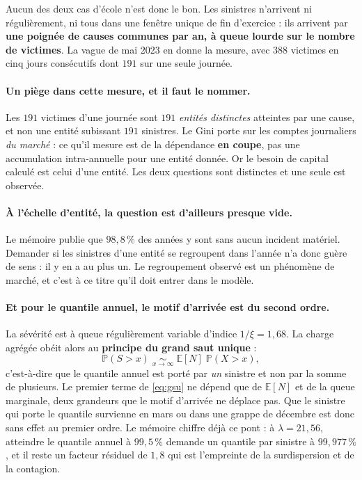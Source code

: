\documentclass[11pt,a4paper]{article}
\newcommand{\E}{\mathbb{E}}
\newcommand{\Prob}{\mathbb{P}}
\begin{document}
\vspace{4pt}
\noindent Aucun des deux cas d'école n'est donc le bon. Les sinistres n'arrivent ni
régulièrement, ni tous dans une fenêtre unique de fin d'exercice : ils arrivent par
\textbf{une poignée de causes communes par an, à queue lourde sur le nombre de victimes}. La
vague de mai 2023 en donne la mesure, avec $388$ victimes en cinq jours consécutifs dont
$191$ sur une seule journée.

\paragraph{Un piège dans cette mesure, et il faut le nommer.} Les $191$ victimes d'une
journée sont $191$ \emph{entités distinctes} atteintes par une cause, et non une entité
subissant $191$ sinistres. Le Gini porte sur les comptes journaliers \emph{du marché} : ce
qu'il mesure est de la dépendance \textbf{en coupe}, pas une accumulation intra-annuelle
pour une entité donnée. Or le besoin de capital calculé est celui d'une entité. Les deux
questions sont distinctes et une seule est observée.

\paragraph{À l'échelle d'entité, la question est d'ailleurs presque vide.} Le mémoire publie
que $98{,}8\,\%$ des années y sont sans aucun incident matériel. Demander si les sinistres
d'une entité se regroupent dans l'année n'a donc guère de sens : il y en a au plus un. Le
regroupement observé est un phénomène de marché, et c'est à ce titre qu'il doit entrer dans
le modèle.

\paragraph{Et pour le quantile annuel, le motif d'arrivée est du second ordre.} La sévérité
est à queue régulièrement variable d'indice $1/\xi = 1{,}68$. La charge agrégée obéit alors
au \textbf{principe du grand saut unique} :
\begin{equation}
\label{eq:gsu}
  \Prob(S > x) \;\underset{x \to \infty}{\sim}\; \E[N]\;\Prob(X > x),
\end{equation}
c'est-à-dire que le quantile annuel est porté par \emph{un} sinistre et non par la somme de
plusieurs. Le premier terme de \eqref{eq:gsu} ne dépend que de $\E[N]$ et de la queue
marginale, deux grandeurs que le motif d'arrivée ne déplace pas. Que le sinistre qui porte
le quantile survienne en mars ou dans une grappe de décembre est donc sans effet au premier
ordre. Le mémoire chiffre déjà ce pont : à $\lambda = 21{,}56$, atteindre le quantile annuel
à $99{,}5\,\%$ demande un quantile par sinistre à $99{,}977\,\%$, et il reste un facteur
résiduel de $1{,}8$ qui est l'empreinte de la surdispersion et de la contagion.
\end{document}
